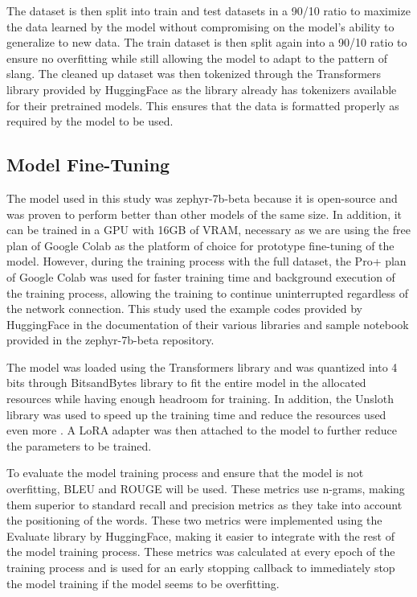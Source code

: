 The dataset is then split into train and test datasets in a 90/10 ratio to maximize the data learned by the model without compromising on the model's ability to generalize to new data. The train dataset is then split again into a 90/10 ratio to ensure no overfitting while still allowing the model to adapt to the pattern of slang. The cleaned up dataset was then tokenized through the Transformers library provided by HuggingFace as the library already has tokenizers available for their pretrained models.
This ensures that the data is formatted properly as required by the model to be used.

\subsection{Model Fine-Tuning}
The model used in this study was zephyr-7b-beta because it is open-source and was proven to perform better than other models of the same size. In addition, it can be trained in a GPU with 16GB of VRAM, necessary as we are using the free plan of Google Colab as the platform of choice for prototype fine-tuning of the model. However, during the training process with the full dataset, the Pro+ plan of Google Colab was used for faster training time and background execution of the training process, allowing the training to continue uninterrupted regardless of the network connection.
This study used the example codes provided by HuggingFace in the documentation of their various libraries and sample notebook provided in the zephyr-7b-beta repository. 

The model was loaded using the Transformers library and was quantized into 4 bits through BitsandBytes library to fit the entire model in the allocated resources while having enough headroom for training. In addition, the Unsloth library was used to speed up the training time and reduce the resources used even more \cite{unsloth}. A LoRA adapter was then attached to the model to further reduce the parameters to be trained.

To evaluate the model training process and ensure that the model is not overfitting, BLEU and ROUGE will be used. These metrics use n-grams, making them superior to standard recall and precision metrics as they take into account the positioning of the words. These two metrics were implemented using the Evaluate library by HuggingFace, making it easier to integrate with the rest of the model training process. These metrics was calculated at every epoch of the training process and is used for an early stopping callback to immediately stop the model training if the model seems to be overfitting.

